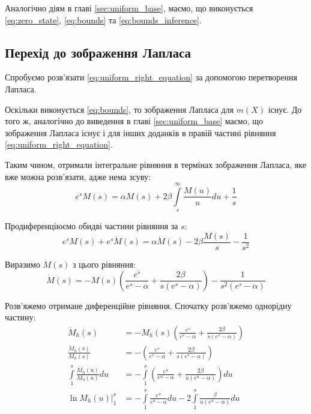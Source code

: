 Аналогічно діям в главі \ref{sec:uniform_base}, маємо, що виконується \eqref{eq:zero_state}, \eqref{eq:bounds} та \eqref{eq:bounds_inference}.

\subsection{Перехід до зображення Лапласа}
\label{sec:uniform_right_integral_laplace}

Спробуємо розв'язати \eqref{eq:uniform_right_equation} за допомогою перетворення Лапласа.

Оскільки виконується \eqref{eq:bounds}, то зображення Лапласа для $m(X)$ існує. До того ж, аналогічно до виведення в главі \ref{sec:uniform_base} маємо, що зображення Лапласа існує і для інших доданків в правій частині рівняння \eqref{eq:uniform_right_equation}.

Таким чином, отримали інтегральне рівняння в термінах зображення Лапласа, яке вже можна розв'язати, адже нема зсуву:
\begin{equation}
	\label{eq:uniform_right_laplace_integral}
	e^s M(s) = \alpha M(s) + 2\beta \int\limits_s^\infty \frac{M(u)}{u} du + \frac{1}{s}
\end{equation}

Продиференціюємо обидві частини рівняння за $s$:
\begin{equation}
	e^s M(s) + e^s \dot M(s) =\alpha \dot M(s) - 2 \beta \frac{M(s)}{s}  - \frac1{s^2}
\end{equation}

Виразимо $\dot M(s)$ з цього рівняння:
\begin{equation}
	\label{eq:uniform_right_laplace_diff}
	\dot M(s) = - M(s)\left(\frac{e^s}{e^s - \alpha} + \frac{2\beta}{s(e^s - \alpha)}\right) - \frac{1}{s^2(e^s - \alpha)}
\end{equation}

Розв'яжемо отримане диференційне рівняння. Спочатку розв'яжемо однорідну частину:
\begin{align*}
	\dot M_h (s) &= - M_h (s)\left(\frac{e^s}{e^s - \alpha} + \frac{2\beta}{s(e^s - \alpha)}\right) \\
	\frac{\dot M_h (s)}{M_h (s)} &= -\left(\frac{e^s}{e^s - \alpha} + \frac{2\beta}{s(e^s - \alpha)}\right) \\
	\int\limits_1^s \frac{\dot M_h (u)}{M_h (u)} du &= -\int\limits_1^s \left(\frac{e^u}{e^u - \alpha} + \frac{2\beta}{u(e^u - \alpha)}\right) du \\
	\left. \ln{M_h (u)}\right|_1^s &= - \int\limits_1^s \frac{e^u}{e^u - \alpha} du  - 2 \int\limits_1^s \frac{\beta}{u(e^u - \alpha)} du
\end{align*}

